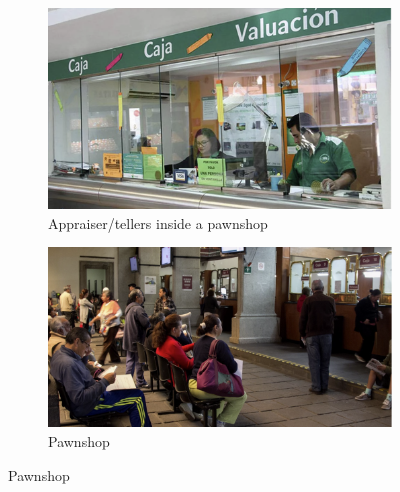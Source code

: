 \documentclass[oneside,11pt]{article}
\begin{document}
\begin{figure}[H]
     \caption{Some Pawnshops}
    \label{PawnshopPicture}
    \begin{center}
    \begin{subfigure}{0.42\textwidth}
    \caption{Appraiser/tellers inside a pawnshop}
        \centering
        \includegraphics[width=\textwidth]{Figuras/empenio9.png}
    \end{subfigure}
        \begin{subfigure}{0.45\textwidth}
    \caption{Pawnshop}
        \centering
        \includegraphics[width=\textwidth]{Figuras/empenio11.png}
    \end{subfigure}
    
        \vspace{3ex}


\end{center}
\end{figure}
\end{document}
